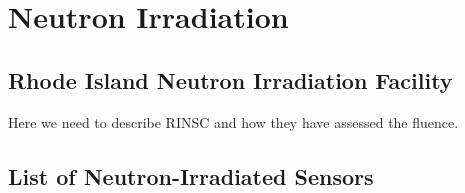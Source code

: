 \section{Neutron Irradiation}
\label{sec:irradiation}

\subsection{Rhode Island Neutron Irradiation Facility}
\label{subsec:RINSC}
Here we need to describe RINSC and how they have assessed the fluence.


\subsection{List of Neutron-Irradiated Sensors}
\label{subsec:sensors_irradiation}
